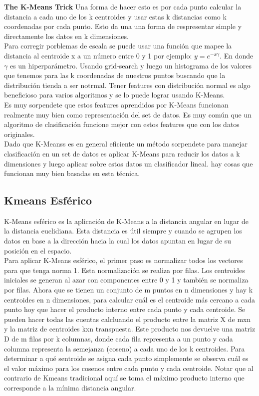 \documentclass[titlepage,a4paper]{article}
\begin{document}
\textbf{The K-Means Trick}	Una forma de hacer esto es por cada punto calcular la distancia a cada uno de los k centroides y usar estas k distancias como k coordenadas por cada punto. Esto da una una forma de respresentar simple y directamente los datos en k dimensiones. \\

Para corregir porblemas de escala se puede usar una función que mapee la distancia al centroide x a un número entre 0 y 1 por ejemplo: $y= e^{-x\gamma}$. En donde $\gamma$ es un hiperparámetro. Usando grid-search y luego un histograma de los valores que tenemos para las k coordenadas de nuestros puntos buscando que la distribución tienda a ser notrmal. Tener features con distribución normal es algo beneficioso para varios algoritmos y se lo puede lograr usando K-Means. \\

Es muy sorpendete que estos features aprendidos por K-Means funcionan realmente muy bien como representación del set de datos. Es muy común que un algoritmo de clasificación funcione mejor con estos features que con los datos originales. \\

Dado que K-Meanss es en general eficiente un método sorpendete para manejar clasificación en un set de datos es aplicar K-Means para reducir los datos a k dimensiones y luego aplicar sobre estos datos un clasificador lineal. hay cosas que funcionan muy bien basadas en esta técnica.

\subsection*{Kmeans Esférico}
K-Means esférico es la aplicación de K-Means a la distancia angular en lugar de la distancia euclidiana. Esta distancia es útil siempre y cuando se agrupen los datos en base a la dirección hacia la cual los datos apuntan en lugar de su posición en el espacio. \\

Para aplicar K-Means esférico, el primer paso es normalizar todos los vectores para que tenga norma 1. Esta normalización se realiza por filas. Los centroides iniciales se generan al azar con componentes entre 0 y 1 y también se normaliza por filas. Ahora que se tienen un conjunto de m puntos en n dimensiones y hay k centroides en n dimensiones, para calcular cuál es el centroide más cercano a cada punto hoy que hacer el producto interno entre cada punto y cada centroide. Se pueden hacer todas las cuentas calcluando el producto entre la matriz X de mxn y la matriz de centroides kxn transpuesta.  Este producto nos devuelve una matriz D de m filas por k columnas, donde cada fila representa a un punto y cada columna representa la semejanza (coseno) a cada uno de los k centroides. Para determinar a qué sentroide se asigna cada punto simplemente se observa cuál es el valor máximo para los cosenos entre cada punto y cada centroide. Notar que al contrario de Kmeans tradicional aquí se toma el máximo producto interno que corresponde a la mínima distancia angular. \\
\end{document}
